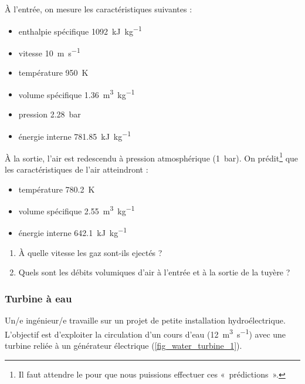 	
	À l’entrée, on mesure les caractéristiques suivantes :
		
	\begin{itemize}
		\item enthalpie spécifique 		\tab \SI{1092}{\kilo\joule\per\kilogram}
		\item vitesse  						\tab \SI{10}{\metre\per\second}
		\item température  					\tab \SI{950}{\kelvin}
		\item volume spécifique  			\tab \SI{1,36}{\metre\cubed\per\kilogram}
		\item pression  						\tab \SI{2,28}{\bar}
		\item énergie interne  				\tab \SI{781,85}{\kilo\joule\per\kilogram}
	\end{itemize}

	À la sortie, l’air est redescendu à pression atmosphérique (\SI{1}{\bar}). On prédit\footnote{Il faut attendre le \coursquatre pour que nous puissions effectuer ces «~prédictions~».} que les caractéristiques de l’air atteindront :
		
	\begin{itemize}
		\item température  				\tab \SI{780,2}{\kelvin}
		\item volume spécifique  		\tab \SI{2,55}{\metre\cubed\per\kilogram}
		\item énergie interne  			\tab \SI{642,1}{\kilo\joule\per\kilogram}
	\end{itemize}


	\begin{enumerate}
		\item À quelle vitesse les gaz sont-ils ejectés ?
		\item Quels sont les débits volumiques d’air à l’entrée et à la sortie de la tuyère ?
	\end{enumerate}
	

\subsubsection{Turbine à eau}
\label{exo_turbine_eau}

	Un/e ingénieur/e travaille sur un projet de petite installation hydroélectrique. L’objectif est d’exploiter la circulation d’un cours d’eau (\SI{12}{\metre\cubed\per\second}) avec une turbine reliée à un générateur électrique (\cref{fig_water_turbine_1}).
	
